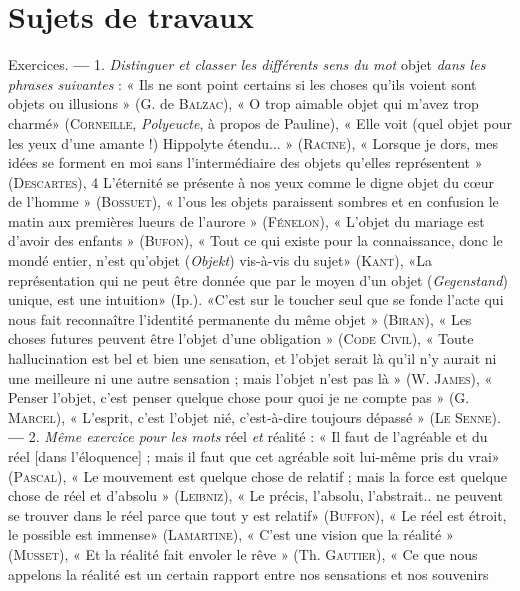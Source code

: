 \section{Sujets de travaux}


Exercices. {\bf —} 1. {\it Distinguer et classer les différents sens du mot} objet {\it dans
les phrases suivantes} : « Ils ne sont point certains si les choses qu'ils voient
sont objets ou illusions » (G. de \textsc{Balzac}), « O trop aimable objet qui m'avez
trop charmé» (\textsc{Corneille}, {\it Polyeucte}, à propos de Pauline), « Elle voit
(quel objet pour les yeux d’une amante !) Hippolyte étendu... » (\textsc{Racine}),
« Lorsque je dors, mes idées se forment en moi sans l'intermédiaire des
objets qu’elles représentent » (\textsc{Descartes}), 4 L'éternité se présente à nos
yeux comme le digne objet du cœur de l’homme » (\textsc{Bossuet}), « l'ous les
objets paraissent sombres et en confusion le matin aux premières lueurs de
l’aurore » (\textsc{Fénelon}), « L'objet du mariage est d’avoir des enfants » (\textsc{Bufon}),
« Tout ce qui existe pour la connaissance, donc le mondé entier, n’est
qu’objet ({\it Objekt}) vis-à-vis du sujet» (\textsc{Kant}), «La représentation qui ne
peut être donnée que par le moyen d’un objet ({\it Gegenstand}) unique, est
une intuition» (Ip.). «C'est sur le toucher seul que se fonde l'acte qui
nous fait reconnaître l'identité permanente du même objet » (\textsc{Biran}), « Les
choses futures peuvent être l’objet d’une obligation » (\textsc{Code Civil}), « Toute
hallucination est bel et bien une sensation, et l’objet serait là qu'il n'y
aurait ni une meilleure ni une autre sensation ; mais l’objet n’est pas là »
(W. \textsc{James}), « Penser l’objet, c’est penser quelque chose pour quoi je ne
compte pas » (G. \textsc{Marcel}), « L'esprit, c’est l’objet nié, c’est-à-dire toujours
dépassé » (\textsc{Le Senne}). {\bf —} 2. {\it Même exercice pour les mots} réel {\it et} réalité :
« Il faut de l’agréable et du réel [dans l’éloquence] ; mais il faut que cet
agréable soit lui-même pris du vrai» (\textsc{Pascal}), « Le mouvement est quelque
chose de relatif ; mais la force est quelque chose de réel et d’absolu »
(\textsc{Leibniz}), « Le précis, l'absolu, l’abstrait.. ne peuvent se trouver dans
le réel parce que tout y est relatif» (\textsc{Buffon}), « Le réel est étroit, le
possible est immense» (\textsc{Lamartine}), « C’est une vision que la réalité »
(\textsc{Musset}), « Et la réalité fait envoler le rêve » (Th. \textsc{Gautier}), « Ce que nous
appelons la réalité est un certain rapport entre nos sensations et nos souvenirs
